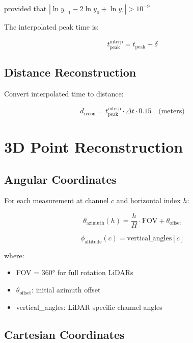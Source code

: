 \documentclass[11pt]{article}
\begin{document}
provided that $|\ln y_{-1} - 2\ln y_0 + \ln y_1| > 10^{-9}$.

The interpolated peak time is:

\begin{equation}
t_{\text{peak}}^{\text{interp}} = t_{\text{peak}} + \delta
\end{equation}

\subsection{Distance Reconstruction}

Convert interpolated time to distance:

\begin{equation}
d_{\text{recon}} = t_{\text{peak}}^{\text{interp}} \cdot \Delta t \cdot 0.15 \quad \text{(meters)}
\end{equation}

\section{3D Point Reconstruction}

\subsection{Angular Coordinates}

For each measurement at channel $c$ and horizontal index $h$:

\begin{equation}
\theta_{\text{azimuth}}(h) = \frac{h}{H} \cdot \text{FOV} + \theta_{\text{offset}}
\end{equation}

\begin{equation}
\phi_{\text{altitude}}(c) = \text{vertical\_angles}[c]
\end{equation}

where:
\begin{itemize}
    \item FOV = 360° for full rotation LiDARs
    \item $\theta_{\text{offset}}$: initial azimuth offset
    \item vertical\_angles: LiDAR-specific channel angles
\end{itemize}

\subsection{Cartesian Coordinates}
\end{document}
